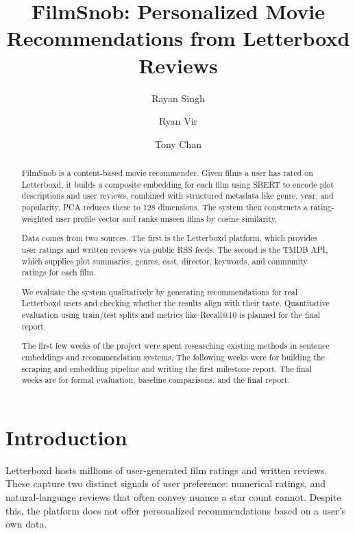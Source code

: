 \documentclass[sigconf,nonacm]{acmart}
\begin{document}
\title{FilmSnob: Personalized Movie Recommendations from Letterboxd Reviews}

\author{Rayan Singh}
\author{Ryan Vir}
\author{Tony Chan}

\begin{abstract}
FilmSnob is a content-based movie recommender. Given films a user has rated on Letterboxd, it builds a composite embedding for each film using SBERT to encode plot descriptions and user reviews, combined with structured metadata like genre, year, and popularity. PCA reduces these to 128 dimensions. The system then constructs a rating-weighted user profile vector and ranks unseen films by cosine similarity.

Data comes from two sources. The first is the Letterboxd platform, which provides user ratings and written reviews via public RSS feeds. The second is the TMDB API, which supplies plot summaries, genres, cast, director, keywords, and community ratings for each film.

We evaluate the system qualitatively by generating recommendations for real Letterboxd users and checking whether the results align with their taste. Quantitative evaluation using train/test splits and metrics like Recall@10 is planned for the final report.

The first few weeks of the project were spent researching existing methods in sentence embeddings and recommendation systems. The following weeks were for building the scraping and embedding pipeline and writing the first milestone report. The final weeks are for formal evaluation, baseline comparisons, and the final report.
\end{abstract}

\maketitle

\section{Introduction}

Letterboxd hosts millions of user-generated film ratings and written reviews. These capture two distinct signals of user preference: numerical ratings, and natural-language reviews that often convey nuance a star count cannot. Despite this, the platform does not offer personalized recommendations based on a user's own data.
\end{document}
